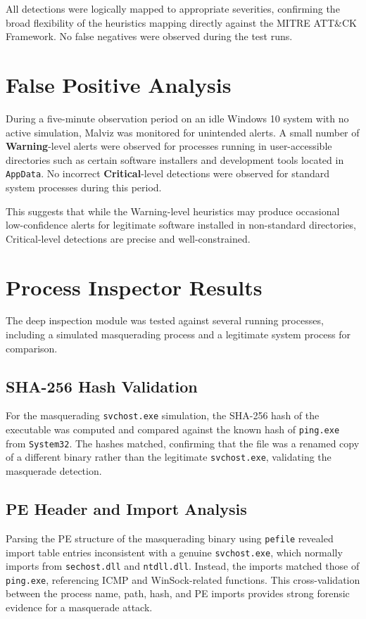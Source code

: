 All detections were logically mapped to appropriate severities, confirming the broad flexibility of the heuristics mapping directly against the MITRE ATT\&CK Framework. No false negatives were observed during the test runs.

\section{False Positive Analysis}

During a five-minute observation period on an idle Windows 10 system with no active simulation, Malviz was monitored for unintended alerts. A small number of \textbf{Warning}-level alerts were observed for processes running in user-accessible directories such as certain software installers and development tools located in \texttt{AppData}. No incorrect \textbf{Critical}-level detections were observed for standard system processes during this period.

This suggests that while the Warning-level heuristics may produce occasional low-confidence alerts for legitimate software installed in non-standard directories, Critical-level detections are precise and well-constrained.

\section{Process Inspector Results}

The deep inspection module was tested against several running processes, including a simulated masquerading process and a legitimate system process for comparison.

\subsection{SHA-256 Hash Validation}

For the masquerading \texttt{svchost.exe} simulation, the SHA-256 hash of the executable was computed and compared against the known hash of \texttt{ping.exe} from \texttt{System32}. The hashes matched, confirming that the file was a renamed copy of a different binary rather than the legitimate \texttt{svchost.exe}, validating the masquerade detection.

\subsection{PE Header and Import Analysis}

Parsing the PE structure of the masquerading binary using \texttt{pefile} revealed import table entries inconsistent with a genuine \texttt{svchost.exe}, which normally imports from \texttt{sechost.dll} and \texttt{ntdll.dll}. Instead, the imports matched those of \texttt{ping.exe}, referencing ICMP and WinSock-related functions. This cross-validation between the process name, path, hash, and PE imports provides strong forensic evidence for a masquerade attack.

